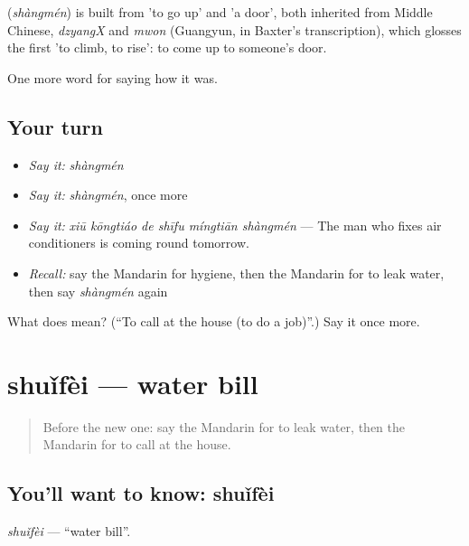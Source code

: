 \begin{cousinweb}
\textbf{} (\emph{shàngmén}) is built from  'to go up' and  'a door', both inherited from Middle Chinese, \emph{dzyangX} and \emph{mwon} (Guangyun, in Baxter's transcription), which glosses the first 'to climb, to rise': to come up to someone's door.
\end{cousinweb}

\begin{grammarlens}[title={What you've built}]
One more word for saying how it was.
\end{grammarlens}

\subsection*{Your turn}
\begin{itemize}
\raggedright
  \item \emph{Say it:} \emph{shàngmén}
  \item \emph{Say it:} \emph{shàngmén}, once more
  \item \emph{Say it:} \emph{xiū kōngtiáo de shīfu míngtiān shàngmén} — The man who fixes air conditioners is coming round tomorrow.
  \item \emph{Recall:} say the Mandarin for hygiene, then the Mandarin for to leak water, then say \emph{shàngmén} again
\end{itemize}

\begin{tcolorbox}[breakable,colback=teal!4,colframe=teal!35!black,title={Before you move on}]
What does  mean? (\textquotedblleft{}To call at the house (to do a job)\textquotedblright{}.) Say it once more.
\end{tcolorbox}
\section[shuǐfèi]{shuǐfèi — water bill}

\label{lesson:ZH-C522-shuifei}



\begin{quote}
Before the new one: say the Mandarin for to leak water, then the Mandarin for to call at the house.
\end{quote}

\subsection*{You'll want to know: shuǐfèi}
\emph{shuǐfèi} — \textquotedblleft{}water bill\textquotedblright{}.

